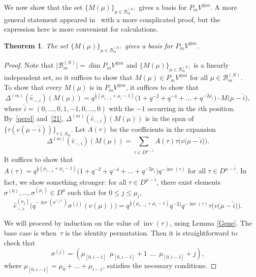 \documentclass[11pt]{article}
\numberwithin{equation}{section}
\numberwithin{equation}{section}
\newtheorem{Theorem}{Theorem}[section]
\DeclareMathOperator{\dimension}{dim}
\DeclareMathOperator{\inv}{inv}
\begin{document}
We now show that the set $ \{M(\mu)\}_{\mu\in \mathcal{B}^{(N)}_m} $ gives a basis for $ P_{m}V^{\otimes m} $. A more general statement appeared in~\cite{KIMRN} with a more complicated proof, but the expression here is more convenient for calculations.
\begin{Theorem}
	The set $ \{M(\mu)\}_{\mu\in \mathcal{B}^{(N)}_m} $ gives a basis for $ P_{m}V^{\otimes m} $.
\end{Theorem}
\begin{proof}
Note that $ \big|\mathcal{B}^{(N)}_m\big|= \dimension P_mV^{\otimes m} $ and $ \{M(\mu)\}_{\mu\in \mathcal{B}^{(N)}_m} $ is a linearly independent set, so it suffices to show that $ M(\mu) \in P_mV^{\otimes m} $ for all $ \mu \in \mathcal{B}^{(N)}_m $. To show that every $ M(\mu) $ is in $ P_{m}V^{\otimes m} $, it suffices to show that \begin{equation} \label{hati}
\Delta^{(m)}(\hat{e}_{-,i}) (M(\mu))=q^{\frac{1}{2}(\mu_{i-1}+\mu_i-1)} \big(1+q^{-2}+q^{-4}+\dots+q^{-2\mu_i}\big) \cdot M\big(\mu-\hat{i}\big),
\end{equation}
where $ \hat{i}=(0,\dots,0,1,-1,0,\dots,0) $ with the $ -1 $ occurring in the $ i $th position. By~\eqref{qerel} and~\eqref{21}, $ \Delta^{(m)} (\hat{e}_{-,i})(M(\mu)) $ is in the span of $ \{\tau(v(\mu-\hat{i}))\}_{\tau\in S_m}$. Let $ A(\tau) $ be the coefficients in the expansion
\[
 \Delta^{(m)} (\hat{e}_{-,i})(M(\mu)) = \sum_{\tau \in D^{\mu-\hat{i}}} A(\tau)\tau \big(v\big(\mu-\hat{i}\big)\big).
\]
It suffices to show that $A(\tau)= q^{\frac{1}{2}(\mu_{i-1}+\mu_i-1)}\big(1+q^{-2}+q^{-4}+\dots+q^{-2\mu_i}\big) q^{-\inv(\tau)}$ for all $\tau \in D^{\mu-\hat{i}}$. In fact, we show something stronger: for all $\tau \in D^{\mu-\hat{i}}$, there exist elements $\sigma^{(0)},\dots, \sigma^{(\mu_i)}\in D^{\mu}$ such that for $0 \leq j \leq \mu_i$,
\[
\hat{e}_{-,i}^{(a_j)} \big( q^{-\inv(\sigma^{(j)})} \sigma^{(j)}(v(\mu)) \big) = q^{\frac{1}{2}(\mu_{i-1}+\mu_i-1)} q^{-2j} q^{-\inv(\tau)} \tau\big(v\big(\mu- \hat{i}\big)\big).
\]

We will proceed by induction on the value of $\inv(\tau)$, using Lemma \ref{Gene}. The base case is when~$\tau$ is the identity permutation. Then it is straightforward to check that
\[
\sigma^{(j)} = (\mu_{[0,i-1]} \ \ \mu_{[0,i-1]}+1 \ \ \dots \ \ \mu_{[0,i-1]}+j),
\]
where $\mu_{[0,i-1]}= \mu_0 + \dots + \mu_{i-1}$, satisfies the necessary conditions.


\end{proof}
\end{document}
